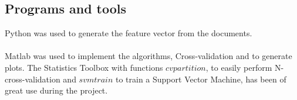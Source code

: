 \subsection{Programs and tools}
Python was used to generate the feature vector from the documents.
\\\\
Matlab was used to implement the algorithms, Cross-validation and to generate plots. The Statistics Toolbox with functions $cvpartition$, to easily perform N-cross-validation and $svmtrain$ to train a Support Vector Machine, has been of great use during the project.

